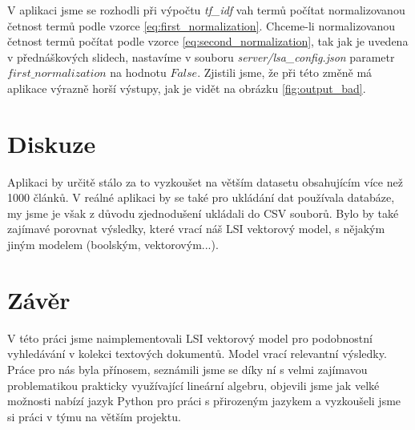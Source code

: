 \documentclass[11pt]{scrartcl} %
\begin{document}
V aplikaci jsme se rozhodli při výpočtu \emph{tf\_idf} vah termů počítat normalizovanou četnost termů podle vzorce \ref{eq:first_normalization}. Chceme-li normalizovanou četnost termů počítat podle vzorce \ref{eq:second_normalization}, tak jak je uvedena v přednáškových slidech, nastavíme v souboru \emph{server/lsa\_config.json} parametr $\mathit{first\_normalization}$ na hodnotu $\mathit{False}$. Zjistili jsme, že při této změně má aplikace výrazně horší výstupy, jak je vidět na obrázku \ref{fig:output_bad}.

\section{Diskuze}

Aplikaci by určitě stálo za to vyzkoušet na větším datasetu obsahujícím více než 1000 článků. V reálné aplikaci by se také pro ukládání dat používala databáze, my jsme je však z důvodu zjednodušení ukládali do CSV souborů. Bylo by také zajímavé porovnat výsledky, které vrací náš LSI vektorový model, s nějakým jiným modelem (boolským, vektorovým...).

\section{Závěr}

V této práci jsme naimplementovali LSI vektorový model pro podobnostní vyhledávání v kolekci textových dokumentů. Model vrací relevantní výsledky. Práce pro nás byla přínosem, seznámili jsme se díky ní s velmi zajímavou problematikou prakticky využívající lineární algebru, objevili jsme jak velké možnosti nabízí jazyk Python pro práci s přirozeným jazykem a vyzkoušeli jsme si práci v týmu na větším projektu.
\end{document}
